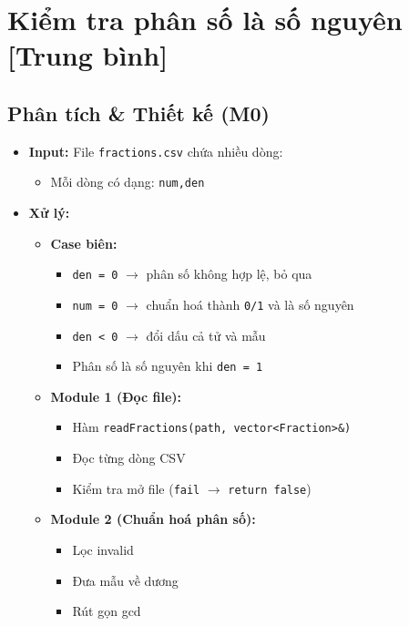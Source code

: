 \section{Kiểm tra phân số là số nguyên [Trung bình]}
\subsection{Phân tích \& Thiết kế (M0)}
\begin{itemize}
    \item \textbf{Input:}
    File \texttt{fractions.csv} chứa nhiều dòng:
    \begin{itemize}
        \item Mỗi dòng có dạng: \texttt{num,den}
    \end{itemize}

    \item \textbf{Xử lý:}
    \begin{itemize}
        \item \textbf{Case biên:}
        \begin{itemize}
            \item \texttt{den = 0} $\rightarrow$ phân số không hợp lệ, bỏ qua
            \item \texttt{num = 0} $\rightarrow$ chuẩn hoá thành \texttt{0/1} và là số nguyên
            \item \texttt{den < 0} $\rightarrow$ đổi dấu cả tử và mẫu
            \item Phân số là số nguyên khi \texttt{den = 1}
        \end{itemize}

        \item \textbf{Module 1 (Đọc file):}
        \begin{itemize}
            \item Hàm \texttt{readFractions(path, vector<Fraction>\&)}
            \item Đọc từng dòng CSV
            \item Kiểm tra mở file (\texttt{fail} $\rightarrow$ \texttt{return false})
        \end{itemize}

        \item \textbf{Module 2 (Chuẩn hoá phân số):}
        \begin{itemize}
            \item Lọc invalid
            \item Đưa mẫu về dương
            \item Rút gọn gcd
        \end{itemize}


\end{itemize}
\end{itemize}
